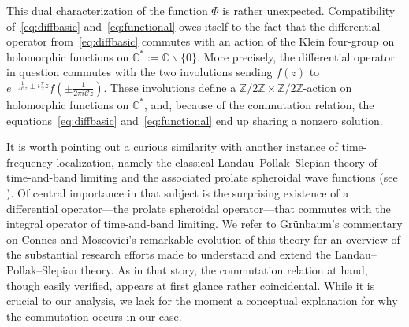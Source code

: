 \documentclass[12pt]{amsart}
\theoremstyle{plain}
\numberwithin{equation}{section}
\theoremstyle{definition}
\newcommand{\Z}{\mathbb{Z}}
\newcommand{\C}{\mathbb{C}}
\newcommand{\Cone}{\mathscr{C}}
\begin{document}
This dual characterization of the function $\Phi$ is rather unexpected. Compatibility 
of~\eqref{eq:diffbasic} and~\eqref{eq:functional} owes itself to the fact that the differential operator from~\eqref{eq:diffbasic} commutes with an action of the Klein four-group on holomorphic functions on $\C^{*}:=\C\smallsetminus\{0\}$. More precisely, the differential operator in question commutes with the two involutions sending $f(z)$ to $e^{-\frac{1}{4\Cone z}\pm i\frac{\pi}{2}z}f(\pm\frac{1}{2\pi i\Cone z})$. These involutions define a $\Z/2\Z\times \Z/2\Z$-action on holomorphic functions on $\C^{*}$, and, because of the commutation relation, the equations~\eqref{eq:diffbasic} and~\eqref{eq:functional} end up sharing a nonzero solution. %

It is worth pointing out a curious similarity with another instance of time-frequency localization, namely the classical Landau--Pollak--Slepian theory of time-and-band limiting  and the associated prolate spheroidal wave functions (see \cite{SP61, LP61, LP62, Slepian83}). Of central importance in that subject is the surprising existence of a differential operator---the prolate spheroidal operator---that commutes with the integral operator of time-and-band limiting. We refer to Gr\"{u}nbaum's commentary \cite{Grunbaum} on Connes and Moscovici's remarkable evolution of this theory \cite{Connes} for an overview of the substantial research efforts made to understand and extend the Landau--Pollak--Slepian theory.  As in that story, the commutation relation at hand, though easily verified, appears at first glance rather coincidental. While it is crucial to our analysis, we lack for the moment a conceptual explanation for why the commutation occurs in our case.
\end{document}
